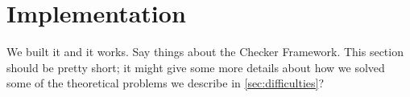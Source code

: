 \section{Implementation}
\label{sec:implementation}

We built it and it works. Say things about the Checker Framework. This section
should be pretty short; it might give some more details about how we solved
some of the theoretical problems we describe in \cref{sec:difficulties}?
